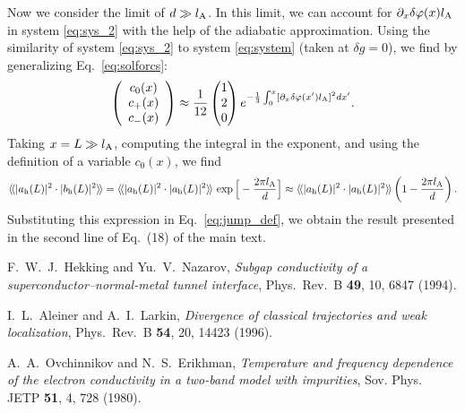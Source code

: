 \documentclass[pra,aps,a4paper,twocolumn,superscriptaddress,longbibliography]{revtex4-2}
\newcommand{\rngl}{\rangle\hspace{-0.05cm}\rangle}
\newcommand{\lngl}{\langle\hspace{-0.05cm}\langle}
\newcommand{\lprox}{L}
\newcommand{\lA}{l_{\rm A}}
\begin{document}
Now we consider the limit of $d \gg \lA$. In this limit, we can account for $\partial_x \delta \varphi(x) \lA$ in system \eqref{eq:sys_2} with the help of the adiabatic approximation. Using the similarity of system \eqref{eq:sys_2} to system \eqref{eq:system} (taken at $\delta g = 0$), we find by generalizing Eq.~\eqref{eq:solforcs}:
\begin{equation}
\left(\begin{array}{c}
c_0(x)\\
c_+(x)\\
c_-(x)
\end{array}\right) \approx \frac{1}{12} \begin{pmatrix}
1 \\ 2\\ 0
\end{pmatrix} e^{-\frac{1}{3}\int_0^x [\partial_x \delta \varphi(x^\prime) \lA]^2 dx^\prime}.
\end{equation}
Taking $x = \lprox \gg \lA$, computing the integral in the exponent, and using the definition of a variable $c_0(x)$, we find
\begin{equation}
    \lngl |a_{\rm h}(\lprox)|^2 \cdot |b_{\rm h}(\lprox)|^2\rngl   = \lngl |a_{\rm h}(\lprox)|^2 \cdot |a_{\rm h}(\lprox)|^2\rngl\,\exp\Big[-\frac{2\pi \lA}{d}\Big] \approx \lngl |a_{\rm h}(\lprox)|^2 \cdot |a_{\rm h}(\lprox)|^2\rngl  \left(1 -\frac{2\pi \lA}{d}\right).
\end{equation}
Substituting this expression in Eq.~\eqref{eq:jump_def}, we obtain the result presented in the second line of Eq.~(18) of the main text.

\begin{thebibliography}{100}

F.~W.~J.~Hekking  and Yu.~V.~Nazarov, {\em Subgap conductivity of a superconductor--normal-metal tunnel interface}, Phys.~Rev.~B {\bf 49}, 10, 6847 (1994).

I.~L.~Aleiner and A.~I.~Larkin, {\em Divergence of classical trajectories and weak localization}, Phys.~Rev.~B {\bf 54}, 20, 14423 (1996).

A.~A.~Ovchinnikov and N.~S.~Erikhman, {\em Temperature and frequency dependence of the electron
conductivity in a two-band model with impurities}, Sov. Phys. JETP {\bf 51}, 4, 728 (1980).

\end{thebibliography}
\end{document}
